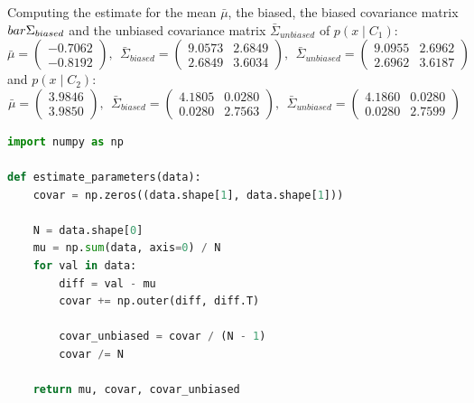 \documentclass[12pt]{article}
\begin{document}
\begin{section}
\begin{subsection}
		Computing the estimate for the mean $\bar{\mu}$, the biased, the biased covariance matrix $\\bar{\Sigma}_{biased}$ and the unbiased covariance matrix $\bar{\Sigma}_{unbiased}$ of $p(x \mid C_1)$:
		\begin{equation*}
		\bar{\mu}=
		\begin{pmatrix}
		-0.7062\\ -0.8192
		\end{pmatrix},~~
		\bar{\Sigma}_{biased}=
		\begin{pmatrix}
		9.0573 & 2.6849\\ 2.6849 & 3.6034
		\end{pmatrix},~~
		\bar{\Sigma}_{unbiased}=
		\begin{pmatrix}
		9.0955 & 2.6962 \\ 2.6962 & 3.6187
		\end{pmatrix}
		\end{equation*}
		and $p(x \mid C_2)$:
		\begin{equation*}
		\bar{\mu}=
		\begin{pmatrix}
		3.9846\\  3.9850
		\end{pmatrix},~~
		\bar{\Sigma}_{biased}=
		\begin{pmatrix}
		4.1805 & 0.0280\\ 0.0280 & 2.7563
		\end{pmatrix},~~
		\bar{\Sigma}_{unbiased}=
		\begin{pmatrix}
		4.1860 & 0.0280 \\ 0.0280 & 2.7599
		\end{pmatrix}
		\end{equation*}
		
		\begin{lstlisting}[language=python,frame=single]
import numpy as np
		
def estimate_parameters(data):
	covar = np.zeros((data.shape[1], data.shape[1]))
	
	N = data.shape[0]
	mu = np.sum(data, axis=0) / N
	for val in data:
		diff = val - mu
		covar += np.outer(diff, diff.T)
		
		covar_unbiased = covar / (N - 1)
		covar /= N
	
	return mu, covar, covar_unbiased
		\end{lstlisting}
		
		
				

\end{subsection}
\end{section}
\end{document}
